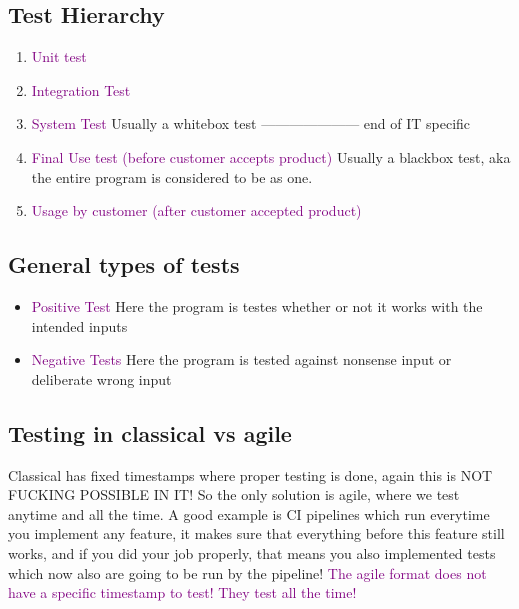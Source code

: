 \documentclass[main.tex,fontsize=12pt,paper=a4,paper=landscape,DIV=calc,]{scrartcl}
\begin{document}
\begin{multicols*}{2}
\subsection{Test Hierarchy} 
\begin{enumerate}
\item \textcolor{purple}{Unit test}
\item \textcolor{purple}{Integration Test}
\item \textcolor{purple}{System Test}\newline
  Usually a whitebox test\newline
  --------------------- end of IT specific
\item \textcolor{purple}{Final Use test (before customer accepts product)}\newline
  Usually a blackbox test, aka the entire program is considered to be as one.
\item \textcolor{purple}{Usage by customer (after customer accepted product)}
\end{enumerate} 

\subsection{General types of tests}
\begin{itemize}
\item \textcolor{purple}{Positive Test}\newline
  Here the program is testes whether or not it works with the intended inputs
\item \textcolor{purple}{Negative Tests}\newline
  Here the program is tested against nonsense input or deliberate wrong input
\end{itemize} 

\subsection{Testing in classical vs agile}
Classical has fixed timestamps where proper testing is done, again this is NOT FUCKING POSSIBLE IN IT!\newline
So the only solution is agile, where we test anytime and all the time.\newline
A good example is CI pipelines which run everytime you implement any feature, it makes sure that everything before this feature still works, and if you did your job properly, that means you also implemented tests which now also are going to be run by the pipeline!\newline
\textcolor{purple}{The agile format does not have a specific timestamp to test! They test all the time!}


\end{multicols*}
\end{document}
